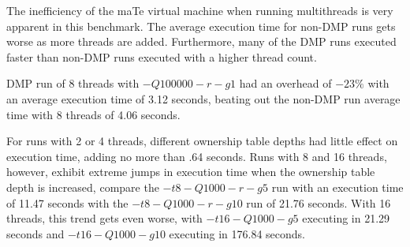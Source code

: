 The inefficiency of the maTe virtual machine when running multithreads
is very apparent in this benchmark.  The average execution time for
non-DMP runs gets worse as more threads are added.  Furthermore, many
of the DMP runs executed faster than non-DMP runs executed with a
higher thread count.

DMP run of 8 threads with $-Q100000 -r -g1$ had an overhead of $-23\%$
with an average execution time of 3.12 seconds, beating out the
non-DMP run average time with 8 threads of 4.06 seconds.


For runs with 2 or 4 threads, different ownership table depths had
little effect on execution time, adding no more than .64 seconds.
Runs with 8 and 16 threads, however, exhibit extreme jumps in
execution time when the ownership table depth is increased, compare
the $-t8 -Q1000 -r -g5$ run with an execution time of 11.47 seconds
with the $-t8 -Q1000 -r -g10$ run of 21.76 seconds.  With 16 threads,
this trend gets even worse, with $-t16 -Q1000 -g5$ executing in 21.29
seconds and $-t16 -Q1000 -g10$ executing in 176.84 seconds.



